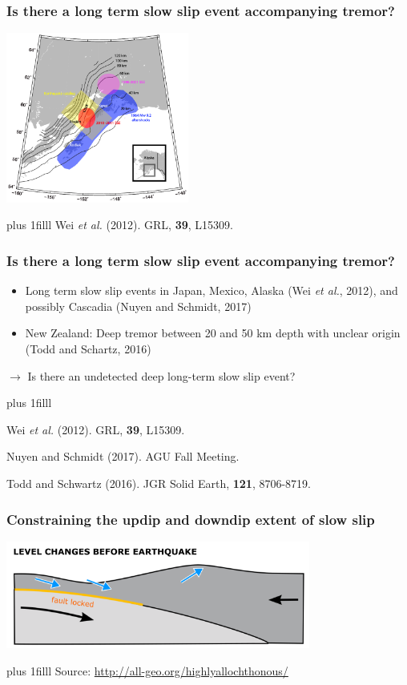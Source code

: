 \documentclass{beamer}
\newcommand{\btVFill}{\vskip0pt plus 1filll}
\begin{document}
	\begin{frame}
		\frametitle{Is there a long term slow slip event accompanying tremor?}
		\begin{center}
			\includegraphics[trim={0cm 0cm 0cm 0cm}, clip, width=6cm]{articles/wei_al_2012_1.png}
		\end{center}
		\btVFill
		\tiny{Wei \textit{et al.} (2012). GRL, \textbf{39}, L15309.}
	\end{frame}

	\begin{frame}
		\frametitle{Is there a long term slow slip event accompanying tremor?}

		\vspace{2em}

		\begin{itemize}
			\item Long term slow slip events in Japan, Mexico, Alaska (Wei \textit{et al.}, 2012), and possibly Cascadia (Nuyen and Schmidt, 2017)
			\item New Zealand: Deep tremor between 20 and 50 km depth with unclear origin (Todd and Schartz, 2016)
		\end{itemize}
		\begin{block}{}
			$\rightarrow$ Is there an undetected deep long-term slow slip event?
		\end{block}
		\btVFill
		\tiny{Wei \textit{et al.} (2012). GRL, \textbf{39}, L15309.

		Nuyen and Schmidt (2017). AGU Fall Meeting.

		Todd and Schwartz (2016). JGR Solid Earth, \textbf{121}, 8706-8719.}
	\end{frame}

	\begin{frame}
		\frametitle{Constraining the updip and downdip extent of slow slip}

		\vspace{2em}

		\begin{center}
			\includegraphics[trim={0cm 0cm 0cm 0cm}, clip, width=10cm]{slowslip/Prequake_level_changes_shallow_thrust.png}
		\end{center}
		\btVFill
		\tiny{Source: \href{http://all-geo.org/highlyallochthonous/}{http://all-geo.org/highlyallochthonous/}}	
	\end{frame}
\end{document}
